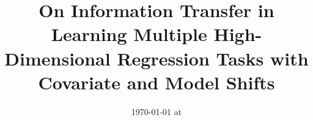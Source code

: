 \documentclass{article}
\begin{document}
\title{On Information Transfer in Learning Multiple High-Dimensional Regression Tasks with Covariate and Model Shifts}
\date{}
\maketitle
\date{{\ddmmyyyydate\today} at \currenttime}










\appendix





\end{document}
